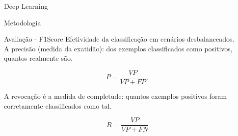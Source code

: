\documentclass{beamer}
\begin{document}
\begin{frame}{Deep Learning}

\begin{frame}{Metodologia}
\begin{block}{Avaliação - F1Score}
\justifying
Efetividade da classificação em cenários desbalanceados. 
\\

A precisão (medida da exatidão): dos exemplos classificados como positivos, quantos realmente são.

\begin{equation}
  P = \frac{VP}{VP + FP},
  \label{precisao}
\end{equation}

A revocação é a medida de completude: quantos exemplos positivos foram corretamente classificados como tal. 

\begin{equation}
  R = \frac{VP}{VP + FN}
  \label{revocacao}
\end{equation}


\end{block}
\end{frame}
\end{frame}
\end{document}
